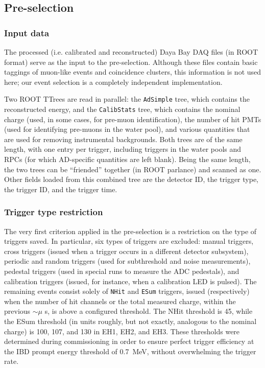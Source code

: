 \documentclass[../thesis.tex]{subfiles}
\begin{document}
\subsection{Pre-selection}
\label{sec:selPreSel}

\subsubsection{Input data}
\label{sec:selInputData}

The processed (i.e. calibrated and reconstructed) Daya Bay DAQ files (in ROOT
format) serve as the input to the pre-selection. Although these files contain
basic taggings of muon-like events and coincidence clusters, this information is
not used here; our event selection is a completely independent implementation.

Two ROOT TTrees are read in parallel: the \texttt{AdSimple} tree, which contains
the reconstructed energy, and the \texttt{CalibStats} tree, which contains the
nominal charge (used, in some cases, for pre-muon identification), the number of
hit PMTs (used for identifying pre-muons in the water pool), and various
quantities that are used for removing instrumental backgrounds. Both trees are
of the same length, with one entry per trigger, including triggers in the water
pools and RPCs (for which AD-specific quantities are left blank). Being the same
length, the two trees can be ``friended'' together (in ROOT parlance) and
scanned as one. Other fields loaded from this combined tree are the detector ID,
the trigger type, the trigger ID, and the trigger time.

\subsubsection{Trigger type restriction}
\label{sec:selTrigType}

The very first criterion applied in the pre-selection is a restriction on the
type of triggers saved. In particular, six types of triggers are excluded:
manual triggers, cross triggers (issued when a trigger occurs in a different
detector subsystem), periodic and random triggers (used for subthreshold and
noise measurements), pedestal triggers (used in special runs to measure the ADC
pedestals), and calibration triggers (issued, for instance, when a calibration
LED is pulsed). The remaining events consist solely of \texttt{NHit} and
\texttt{ESum} triggers, issued (respectively) when the number of hit channels or
the total measured charge, within the previous $\sim\mu$ s, is above a
configured threshold. The NHit threshold is 45, while the ESum threshold (in
units roughly, but not exactly, analogous to the nominal charge) is 100, 107,
and 130 in EH1, EH2, and EH3. These thresholds were determined during
commissioning in order to ensure perfect trigger efficiency at the IBD prompt
energy threshold of 0.7~MeV, without overwhelming the trigger rate.
\end{document}

